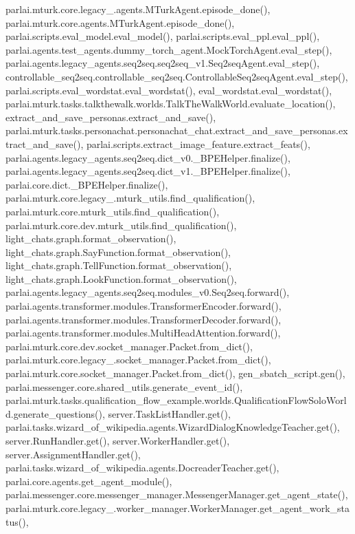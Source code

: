 parlai.\+mturk.\+core.\+legacy\+\_.\+agents.\+M\+Turk\+Agent.\+episode\+\_\+done(), parlai.\+mturk.\+core.\+agents.\+M\+Turk\+Agent.\+episode\+\_\+done(), parlai.\+scripts.\+eval\+\_\+model.\+eval\+\_\+model(), parlai.\+scripts.\+eval\+\_\+ppl.\+eval\+\_\+ppl(), parlai.\+agents.\+test\+\_\+agents.\+dummy\+\_\+torch\+\_\+agent.\+Mock\+Torch\+Agent.\+eval\+\_\+step(), parlai.\+agents.\+legacy\+\_\+agents.\+seq2seq.\+seq2seq\+\_\+v1.\+Seq2seq\+Agent.\+eval\+\_\+step(), controllable\+\_\+seq2seq.\+controllable\+\_\+seq2seq.\+Controllable\+Seq2seq\+Agent.\+eval\+\_\+step(), parlai.\+scripts.\+eval\+\_\+wordstat.\+eval\+\_\+wordstat(), eval\+\_\+wordstat.\+eval\+\_\+wordstat(), parlai.\+mturk.\+tasks.\+talkthewalk.\+worlds.\+Talk\+The\+Walk\+World.\+evaluate\+\_\+location(), extract\+\_\+and\+\_\+save\+\_\+personas.\+extract\+\_\+and\+\_\+save(), parlai.\+mturk.\+tasks.\+personachat.\+personachat\+\_\+chat.\+extract\+\_\+and\+\_\+save\+\_\+personas.\+extract\+\_\+and\+\_\+save(), parlai.\+scripts.\+extract\+\_\+image\+\_\+feature.\+extract\+\_\+feats(), parlai.\+agents.\+legacy\+\_\+agents.\+seq2seq.\+dict\+\_\+v0.\+\_\+\+B\+P\+E\+Helper.\+finalize(), parlai.\+agents.\+legacy\+\_\+agents.\+seq2seq.\+dict\+\_\+v1.\+\_\+\+B\+P\+E\+Helper.\+finalize(), parlai.\+core.\+dict.\+\_\+\+B\+P\+E\+Helper.\+finalize(), parlai.\+mturk.\+core.\+legacy\+\_.\+mturk\+\_\+utils.\+find\+\_\+qualification(), parlai.\+mturk.\+core.\+mturk\+\_\+utils.\+find\+\_\+qualification(), parlai.\+mturk.\+core.\+dev.\+mturk\+\_\+utils.\+find\+\_\+qualification(), light\+\_\+chats.\+graph.\+format\+\_\+observation(), light\+\_\+chats.\+graph.\+Say\+Function.\+format\+\_\+observation(), light\+\_\+chats.\+graph.\+Tell\+Function.\+format\+\_\+observation(), light\+\_\+chats.\+graph.\+Look\+Function.\+format\+\_\+observation(), parlai.\+agents.\+legacy\+\_\+agents.\+seq2seq.\+modules\+\_\+v0.\+Seq2seq.\+forward(), parlai.\+agents.\+transformer.\+modules.\+Transformer\+Encoder.\+forward(), parlai.\+agents.\+transformer.\+modules.\+Transformer\+Decoder.\+forward(), parlai.\+agents.\+transformer.\+modules.\+Multi\+Head\+Attention.\+forward(), parlai.\+mturk.\+core.\+dev.\+socket\+\_\+manager.\+Packet.\+from\+\_\+dict(), parlai.\+mturk.\+core.\+legacy\+\_.\+socket\+\_\+manager.\+Packet.\+from\+\_\+dict(), parlai.\+mturk.\+core.\+socket\+\_\+manager.\+Packet.\+from\+\_\+dict(), gen\+\_\+sbatch\+\_\+script.\+gen(), parlai.\+messenger.\+core.\+shared\+\_\+utils.\+generate\+\_\+event\+\_\+id(), parlai.\+mturk.\+tasks.\+qualification\+\_\+flow\+\_\+example.\+worlds.\+Qualification\+Flow\+Solo\+World.\+generate\+\_\+questions(), server.\+Task\+List\+Handler.\+get(), parlai.\+tasks.\+wizard\+\_\+of\+\_\+wikipedia.\+agents.\+Wizard\+Dialog\+Knowledge\+Teacher.\+get(), server.\+Run\+Handler.\+get(), server.\+Worker\+Handler.\+get(), server.\+Assignment\+Handler.\+get(), parlai.\+tasks.\+wizard\+\_\+of\+\_\+wikipedia.\+agents.\+Docreader\+Teacher.\+get(), parlai.\+core.\+agents.\+get\+\_\+agent\+\_\+module(), parlai.\+messenger.\+core.\+messenger\+\_\+manager.\+Messenger\+Manager.\+get\+\_\+agent\+\_\+state(), parlai.\+mturk.\+core.\+legacy\+\_.\+worker\+\_\+manager.\+Worker\+Manager.\+get\+\_\+agent\+\_\+work\+\_\+status(), 